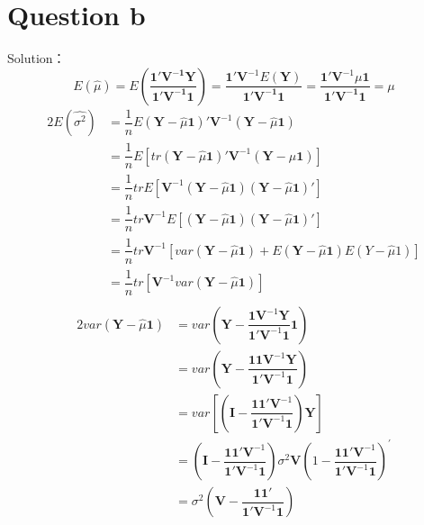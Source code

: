 \documentclass[a4papers]{ctexart}
\begin{document}
\section*{Question b}
\noindent  Solution：
\[E(\hat{\mu}) 
= E\left(\dfrac{\boldsymbol{1}'\boldsymbol{V^{-1}Y}} {\boldsymbol{1}'\boldsymbol{V^{-1}1}}\right) 
= \dfrac{\boldsymbol{1}'\boldsymbol{V}^{-1}E(\boldsymbol{Y})}{\boldsymbol{1}'\boldsymbol{V^{-1}1}} 
=\dfrac{\boldsymbol{1}'\boldsymbol{V}^{-1}\mu\boldsymbol{1}}{\boldsymbol{1}'\boldsymbol{V^{-1}1}} 
=\mu\]
\begin{alignat*}{2}
     E(\hat{\sigma^2})
     &=\dfrac {1}{n}E\left( \boldsymbol{Y}-\hat {\mu }\boldsymbol{1}\right) '\boldsymbol{V}^{-1}\left( \boldsymbol{Y}-\hat {\mu }\boldsymbol{1}\right) \\
     &=\dfrac {1}{n}E\left[ tr \left( \boldsymbol{Y}-\hat {\mu }\boldsymbol{1}\right) '\boldsymbol{V}^{-1}\left( \boldsymbol{Y}-\hat {\mu }\boldsymbol{1}\right) \right]\\
     &=\dfrac {1}{n} tr E\left[  \boldsymbol{V}^{-1}\left( \boldsymbol{Y}-\hat {\mu }\boldsymbol{1}\right)\left( \boldsymbol{Y}-\hat {\mu }\boldsymbol{1}\right)'\right]\\
     &=\dfrac {1}{n} tr \boldsymbol{V}^{-1} E\left[  \left( \boldsymbol{Y}-\hat {\mu }\boldsymbol{1}\right)\left( \boldsymbol{Y}-\hat {\mu }\boldsymbol{1}\right)'\right]\\
     &=\dfrac {1}{n} tr \boldsymbol{V}^{-1} \left[ var\left( \boldsymbol{Y}-\hat {\mu }\boldsymbol{1}\right) +E\left( \boldsymbol{Y}-\hat {\mu }\boldsymbol{1}\right) E\left( Y-\hat {\mu }1\right) \right] \\
     &=\dfrac {1}{n} tr\left[ \boldsymbol{V}^{-1}  var\left( \boldsymbol{Y}-\hat {\mu }\boldsymbol{1}\right) \right] \\
\end{alignat*}
\begin{alignat*}{2}
    var\left( \boldsymbol{Y}-\hat {\mu }\boldsymbol{1}\right)
    &= var\left( \boldsymbol{Y}-\dfrac {\boldsymbol{1}\boldsymbol{V}^{-1}\boldsymbol{Y}}{\boldsymbol{1}'\boldsymbol{V}^{-1}\boldsymbol{1}}\boldsymbol{1}\right) \\
    &= var\left( \boldsymbol{Y}-\dfrac {\boldsymbol{1}\boldsymbol{1}\boldsymbol{V}^{-1}\boldsymbol{Y}}{\boldsymbol{1}'\boldsymbol{V}^{-1}\boldsymbol{1}}\right) \\
    &= var\left[\left( \boldsymbol{I}-\dfrac {\boldsymbol{1}\boldsymbol{1}'\boldsymbol{V}^{-1}}{\boldsymbol{1}'\boldsymbol{V}^{-1}\boldsymbol{1}}\right) \boldsymbol{Y}\right] \\
    &= \left( \boldsymbol{I}-\dfrac {\boldsymbol{1}\boldsymbol{1}'\boldsymbol{V}^{-1}}{\boldsymbol{1}'\boldsymbol{V}^{-1}\boldsymbol{1}}\right) \sigma ^{2}\boldsymbol{V}\left( 1-\dfrac {\boldsymbol{1}\boldsymbol{1}'\boldsymbol{V}^{-1}}{\boldsymbol{1}'\boldsymbol{V}^{-1}\boldsymbol{1}}\right) ^{'}\\
    &=\sigma^2 \left( \boldsymbol{V}-\dfrac {\boldsymbol{1}\boldsymbol{1}'}{\boldsymbol{1}'\boldsymbol{V}^{-1}\boldsymbol{1}}\right)
\end{alignat*}
\end{document}
